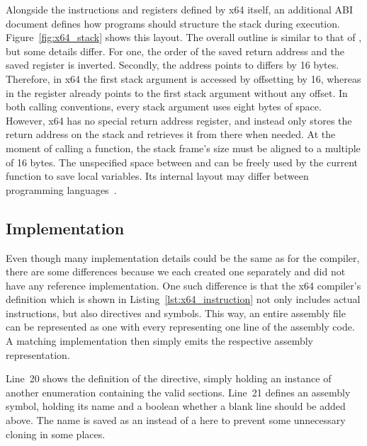 Alongside the instructions and registers defined by x64 itself, an additional ABI document defines how programs should structure the stack during execution.
Figure~\ref{fig:x64_stack} shows this layout.
The overall outline is similar to that of \riscv{}, but some details differ.
For one, the order of the saved return address and the saved  register is inverted.
Secondly, the address  points to differs by 16 bytes.
Therefore, in x64 the first stack argument is accessed by offsetting  by 16, whereas in \riscv{} the  register already points to the first stack argument without any offset.
In both calling conventions, every stack argument uses eight bytes of space.
However, x64 has no special return address register, and instead only stores the return address on the stack and retrieves it from there when needed.
At the moment of calling a function, the stack frame's size must be aligned to a multiple of 16 bytes.
The unspecified space between  and  can be freely used by the current function to save local variables.
Its internal layout may differ between programming languages~\cite[p.~21]{Lu2022}.

\subsection{Implementation}


Even though many implementation details could be the same as for the \riscv{} compiler, there are some differences because we each created one separately and did not have any reference implementation.
One such difference is that the x64 compiler's  definition which is shown in Listing~\ref{lst:x64_instruction} not only includes actual instructions, but also directives and symbols.
This way, an entire assembly file can be represented as one  with every  representing one line of the assembly code.
A matching  implementation then simply emits the respective assembly representation.

Line~20 shows the definition of the  directive, simply holding an instance of another enumeration containing the valid sections.
Line~21 defines an assembly symbol, holding its name and a boolean whether a blank line should be added above.
The name is saved as an  instead of a  here to prevent some unnecessary cloning in some places.

